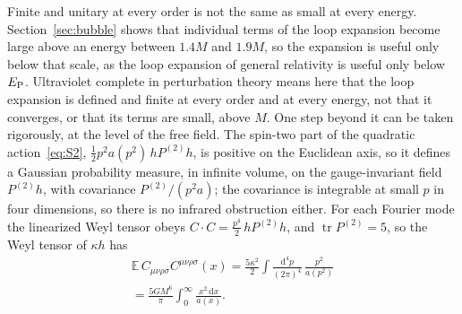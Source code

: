 \documentclass[aps,prd,10pt,twocolumn,superscriptaddress,nofootinbib,floatfix,longbibliography]{revtex4-2}
\newcommand{\bE}{\mathbb{E}}
\newcommand{\dd}{\mathrm{d}}
\newcommand{\Pt}{P^{(2)}}
\begin{document}
Finite and unitary at every order is not the same as small at every energy. Section~\ref{sec:bubble} shows that individual terms of the loop expansion become large above an energy between $1.4M$ and $1.9M$, so the expansion is useful only below that scale, as the loop expansion of general relativity is useful only below $E_{\rm P}$. Ultraviolet complete in perturbation theory means here that the loop expansion is defined and finite at every order and at every energy, not that it converges, or that its terms are small, above $M$. One step beyond it can be taken rigorously, at the level of the free field. The spin-two part of the quadratic action~\eqref{eq:S2}, $\frac12p^2a(p^2)\,h\Pt h$, is positive on the Euclidean axis, so it defines a Gaussian probability measure, in infinite volume, on the gauge-invariant field $\Pt h$, with covariance $\Pt/(p^2a)$; the covariance is integrable at small $p$ in four dimensions, so there is no infrared obstruction either. For each Fourier mode the linearized Weyl tensor obeys $C\cdot C=\frac{p^4}2\,h\Pt h$, and $\operatorname{tr}\Pt=5$, so the Weyl tensor of $\kappa h$ has
\begin{multline}
\label{eq:weyl}
\bE\,C_{\mu\nu\rho\sigma}C^{\mu\nu\rho\sigma}(x)=\frac{5\kappa^2}2\int\frac{\dd^4p}{(2\pi)^4}\,\frac{p^2}{a(p^2)}\\
=\frac{5GM^6}{\pi}\int_0^\infty\frac{x^2\,\dd x}{a(x)} .
\end{multline}
\end{document}
